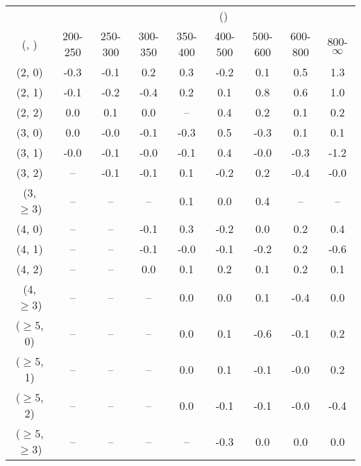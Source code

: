 \begin{table}[h!]
\tiny
\centering
{}
\begin{tabular}
{ccccccccc}
	\hline\hline
&	& \multicolumn{8}{c}{\scalht (\gev)} \\ 
	 (\njet,  \nb) & 200-250 & 250-300 & 300-350 & 350-400 & 400-500 & 500-600 & 600-800 & 800-$\infty$ \\ [0.8ex] 
\hline
	(2, 0) & -0.3 & -0.1 & 0.2 & 0.3 & -0.2 & 0.1 & 0.5 & 1.3 \\[0.5ex] 
	(2, 1) & -0.1 & -0.2 & -0.4 & 0.2 & 0.1 & 0.8 & 0.6 & 1.0 \\[0.5ex] 
	(2, 2) & 0.0 & 0.1 & 0.0 & -- & 0.4 & 0.2 & 0.1 & 0.2 \\[0.5ex] 
	(3, 0) & 0.0 & -0.0 & -0.1 & -0.3 & 0.5 & -0.3 & 0.1 & 0.1 \\[0.5ex] 
	(3, 1) & -0.0 & -0.1 & -0.0 & -0.1 & 0.4 & -0.0 & -0.3 & -1.2 \\[0.5ex] 
	(3, 2) & -- & -0.1 & -0.1 & 0.1 & -0.2 & 0.2 & -0.4 & -0.0 \\[0.5ex] 
	(3, $\ge3$) & -- & -- & -- & 0.1 & 0.0 & 0.4 & -- & -- \\[0.5ex] 
	(4, 0) & -- & -- & -0.1 & 0.3 & -0.2 & 0.0 & 0.2 & 0.4 \\[0.5ex] 
	(4, 1) & -- & -- & -0.1 & -0.0 & -0.1 & -0.2 & 0.2 & -0.6 \\[0.5ex] 
	(4, 2) & -- & -- & 0.0 & 0.1 & 0.2 & 0.1 & 0.2 & 0.1 \\[0.5ex] 
	(4, $\ge3$) & -- & -- & -- & 0.0 & 0.0 & 0.1 & -0.4 & 0.0 \\[0.5ex] 
	($\ge5$, 0) & -- & -- & -- & 0.0 & 0.1 & -0.6 & -0.1 & 0.2 \\[0.5ex] 
	($\ge5$, 1) & -- & -- & -- & 0.0 & 0.1 & -0.1 & -0.0 & 0.2 \\[0.5ex] 
	($\ge5$, 2) & -- & -- & -- & 0.0 & -0.1 & -0.1 & -0.0 & -0.4 \\[0.5ex] 
	($\ge5$, $\ge3$) & -- & -- & -- & -- & -0.3 & 0.0 & 0.0 & 0.0 \\[0.5ex] 
	\hline
	\hline
\end{tabular}
\end{table}

